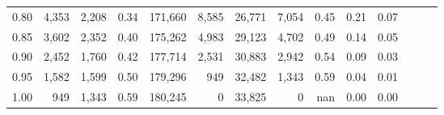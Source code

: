 \begin{tabular}{rrrrrrrrrrrrrr}
0.80 &   4,353 &  2,208 &  0.34 &  171,660 &    8,585 &  26,771 &   7,054 &  0.45 &  0.21 &      0.07 \\
0.85 &   3,602 &  2,352 &  0.40 &  175,262 &    4,983 &  29,123 &   4,702 &  0.49 &  0.14 &      0.05 \\
0.90 &   2,452 &  1,760 &  0.42 &  177,714 &    2,531 &  30,883 &   2,942 &  0.54 &  0.09 &      0.03 \\
0.95 &   1,582 &  1,599 &  0.50 &  179,296 &      949 &  32,482 &   1,343 &  0.59 &  0.04 &      0.01 \\
1.00 &     949 &  1,343 &  0.59 &  180,245 &        0 &  33,825 &       0 &   nan &  0.00 &      0.00 \\
\bottomrule
\end{tabular}

